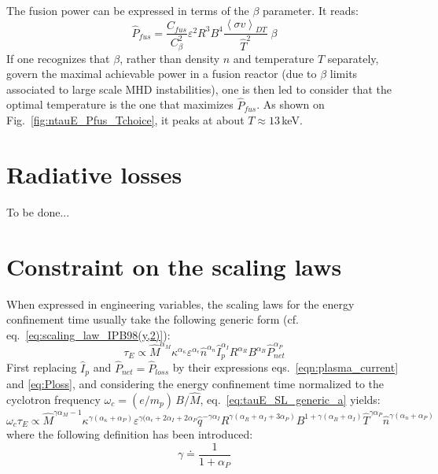 The fusion power can be expressed in terms of the $\beta$ parameter. It reads:
\begin{equation}
\hat P_{fus} = \frac{C_{fus}}{C_\beta^2} \varepsilon^2 R^3 B^4 
 \frac{\left< \sigma v \right>_{DT}}{\hat T^2}\; \beta 
\end{equation}
If one recognizes that $\beta$, rather than density $n$ and temperature $T$ separately, govern the maximal achievable power in a fusion reactor (due to $\beta$ limits associated to large scale MHD instabilities), one is then led to consider that the optimal temperature is the one that maximizes $\hat P_{fus}$. As shown on Fig.~\ref{fig:ntauE_Pfus_Tchoice}, it peaks at about $T\approx 13\,$keV.

\section{Radiative losses}
\label{appendix:radiative_losses}

To be done...

\section{Constraint on the scaling laws}
\label{appendix:scaling_law_dimensionless}

When expressed in engineering variables, the scaling laws for the energy confinement time usually take the following generic form (cf. eq.~\eqref{eq:scaling_law_IPB98(y,2)}):
\begin{equation}
  \label{eq:tauE_SL_generic_a}
  \tau_E \propto \hat M^{\alpha_M} \kappa^{\alpha_\kappa} \varepsilon^{\alpha_\epsilon} \hat n^{\alpha_n} \hat I_p^{\alpha_I} R^{\alpha_R} B^{\alpha_B} \hat P_{net}^{\alpha_P}
\end{equation}
First replacing $\hat I_p$ and $\hat P_{net} = \hat P_{loss}$ by their expressions eqs.~\eqref{eqn:plasma_current} and \eqref{eq:Ploss}, and considering the energy confinement time normalized to the cyclotron frequency $\omega_c = (e/m_p)\, B/\hat M$, eq.~\eqref{eq:tauE_SL_generic_a} yields:
\begin{equation}
\label{eq:tauE_SL_generic_b}
  \omega_c \tau_E \propto 
  \hat M^{\gamma\alpha_M - 1} 
  \kappa^{\gamma(\alpha_\kappa+\alpha_P)} 
  \varepsilon^{\gamma(\alpha_\epsilon+2\alpha_I+2\alpha_P} 
  \hat q^{-\gamma\alpha_I} 
  R^{\gamma(\alpha_R+\alpha_I+3\alpha_P)} 
  B^{1 + \gamma(\alpha_B+\alpha_I)} 
  \hat T^{\gamma\alpha_P}
  \hat n^{\gamma(\alpha_n+\alpha_P)} 
\end{equation}
where the following definition has been introduced:
$$ 
  \gamma \doteq \frac{1}{1+\alpha_P}
$$


